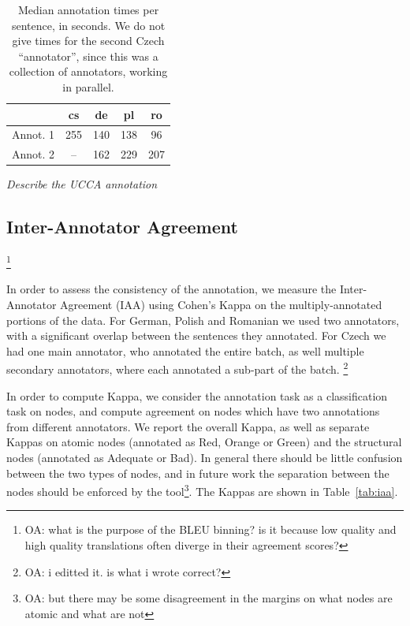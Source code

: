 \documentclass[11pt]{article}
\newcommand{\tabref}[1]{Table~\ref{#1}}
\newcommand{\oa}[1]{\footnote{\color{red}OA: #1}}
\begin{document}
\begin{table}
\begin{center}
\begin{tabular}{l|cccc}
& cs & de & pl & ro \\
\hline
Annot. 1 & 255 & 140  & 138 & 96 \\
Annot. 2 & -- & 162 & 229 & 207 \\
\end{tabular}
\caption{Median annotation times per sentence, in seconds.
We do not give times for the second Czech 
``annotator'', since this was a collection of annotators, working in parallel.}
\label{tab:annot_times}
\end{center}
\end{table}


\emph{Describe the UCCA annotation}





\subsection{Inter-Annotator Agreement}
\label{sec:iaa}

\oa{what is the purpose of the BLEU binning? is it because low quality and high
quality translations often diverge in their agreement scores?}

In order to assess the consistency of the annotation, we measure the Inter-Annotator
Agreement (IAA) using Cohen's Kappa on the multiply-annotated portions of the data.
For German, Polish and Romanian we used two annotators, with a significant overlap
between the sentences they annotated. For Czech we had one main annotator, who
annotated the entire batch, as well multiple secondary annotators, where
each annotated a sub-part of the batch. \oa{i editted it. is what i wrote correct?}

In order to compute Kappa, we consider the annotation task as a classification task on 
nodes, and compute agreement on nodes which have two annotations from different annotators.
We report the overall Kappa, as well as separate Kappas on atomic
nodes (annotated as Red, Orange or Green) and the structural nodes (annotated
as Adequate or Bad). In general there should be little confusion between the two
types of nodes, and in future work the separation between the nodes should be enforced
by the tool\oa{but there may be some disagreement in the margins on what nodes are atomic and
  what are not}. The Kappas are shown in \tabref{tab:iaa}.
\end{document}
